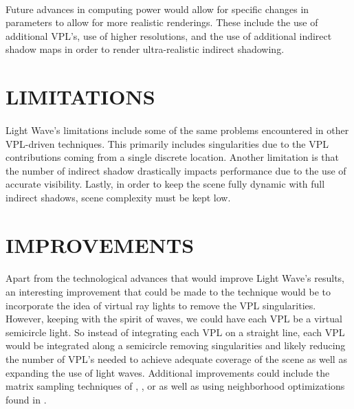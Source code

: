 \paragraph{}
Future advances in computing power would allow for specific changes in parameters to allow for more realistic renderings.  These include the use of additional VPL's, use of higher resolutions, and the use of additional indirect shadow maps in order to render ultra-realistic indirect shadowing.

\section{LIMITATIONS}
\paragraph{}
Light Wave's limitations include some of the same problems encountered in other VPL-driven techniques.  This primarily includes singularities due to the VPL contributions coming from a single discrete location.  Another limitation is that the number of indirect shadow drastically impacts performance due to the use of accurate visibility.  Lastly, in order to keep the scene fully dynamic with full indirect shadows, scene complexity must be kept low.

\section{IMPROVEMENTS}
\paragraph{}
Apart from the technological advances that would improve Light Wave's results, an interesting improvement that could be made to the technique would be to incorporate the idea of virtual ray lights \cite{Novak2012} to remove the VPL singularities.  However, keeping with the spirit of waves, we could have each VPL be a virtual semicircle light.  So instead of integrating each VPL on a straight line, each VPL would be integrated along a semicircle removing singularities and likely reducing the number of VPL's needed to achieve adequate coverage of the scene as well as expanding the use of light waves.  Additional improvements could include the matrix sampling techniques of \cite{Havsan2007}, \cite{Ou2011}, or \cite{Walter2005} as well as using neighborhood optimizations found in \cite{Dachsbacher2006}.